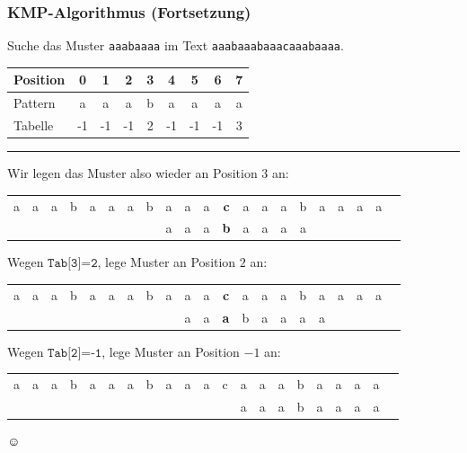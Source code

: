 \documentclass{beamer}
\begin{document}
\begin{frame} \frametitle{KMP-Algorithmus (Fortsetzung)}
	\small
	Suche das Muster \texttt{aaabaaaa} im Text \texttt{aaabaaabaaacaaabaaaa}.
	\begin{center}
		\footnotesize
		\begin{tabular}{l|cccccccc}
			Position &  0 &  1 &  2 &  3 &  4 &  5 &  6 &  7 \\ \hline
			Pattern  &  a &  a &  a &  b &  a &  a &  a &  a \\ \hline
			Tabelle  & -1 & -1 & -1 &  2 & -1 & -1 & -1 &  3 \\
		\end{tabular}
	\end{center}

	\rule{\textwidth}{0.4pt}
	
	\renewcommand*{\arraystretch}{.7}
	\setlength{\tabcolsep}{1pt}
	
	Wir legen das Muster also wieder an Position $3$ an:
	\begin{center}
		\begin{tabular}{ccccccccccccccccccccc}
			a & a & a & b & a & a & a & b & a & a & a & \textbf{c} & a & a & a & b & a & a & a & a \\
			&   &   &   &  &  &  &  & a & a & a & \textbf{b} & a & a & a & a
		\end{tabular}
	\end{center}
	Wegen $\texttt{Tab[3]=2}$, lege Muster an Position $2$ an:
	\begin{center}
		\begin{tabular}{ccccccccccccccccccccc}
			a & a & a & b & a & a & a & b & a & a & a & \textbf{c} & a & a & a & b & a & a & a & a \\
			&   &   &   &  &  &  &  &  & a & a & \textbf{a} & b & a & a & a & a
		\end{tabular}
	\end{center}
	Wegen $\texttt{Tab[2]=-1}$, lege Muster an Position $-1$ an:
	\begin{center}
		\begin{tabular}{ccccccccccccccccccccc}
			a & a & a & b & a & a & a & b & a & a & a & c & a & a & a & b & a & a & a & a \\
			&   &   &   &   &   &   &   &   &   &   &   & a & a & a & b & a & a & a & a &
		\end{tabular}
	$\smiley$
	\end{center}
\end{frame}
\end{document}
